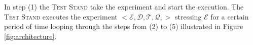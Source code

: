 In step (1) the \textsc{Test Stand} take the experiment and start the execution.  The \textsc{Test Stand} executes the experiment $<\mathcal{E},\mathcal{D},\mathcal{T},\mathcal{Q},>$ stressing $\mathcal{E}$ for a certain period of time looping through the steps from (2) to (5) illustrated in Figure \ref{fig:architecture}.                                                                                                                                                                                                                                                                                                                                                                                                                                                                                                                                                                                                                                                                                                                                                                                                                                                                                                                                                                                                                                                                                                                                                                                                                                                                                                                                                                                                                                                                                                                                                                                                                                                                                                                                                                                                                                                                                                                                                                                                                                                                                                                                                                                                                                                                                                                                                                                                                                                                                                                                                                                                                                                                                                                                                                                                                                                                                                                                                                                                                                                                                                                                     